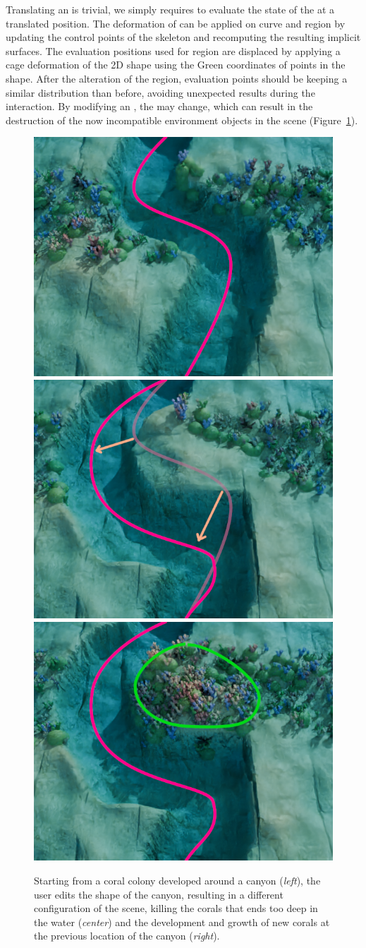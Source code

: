 Translating an  is trivial, we simply requires to evaluate the state of the  at a translated position. The deformation of  can be applied on curve and region  by updating the control points of the skeleton and recomputing the resulting implicit surfaces. The evaluation positions used for region  are displaced by applying a cage deformation of the 2D shape using the Green coordinates of points in the shape. After the alteration of the region, evaluation points should be keeping a similar distribution than before, avoiding unexpected results during the interaction.
By modifying an , the  may change, which can result in the destruction of the now incompatible environment objects in the scene (Figure~\ref{fig:semantic-representation_user-interaction}).

\begin{figure}
    \includegraphics[width = 0.3 \linewidth]{Figures/Interactions/InteractionEdition1.png}
    \includegraphics[width = 0.3 \linewidth]{Figures/Interactions/InteractionEdition2.png}
    \includegraphics[width = 0.3 \linewidth]{Figures/Interactions/InteractionEdition3.png}
    \caption{Starting from a coral colony developed around a canyon (\textit{left}), the user edits the shape of the canyon, resulting in a different configuration of the scene, killing the corals that ends too deep in the water (\textit{center}) and the development and growth of new corals at the previous location of the canyon (\textit{right}). }
    \label{fig:semantic-representation_user-interaction}
\end{figure}

